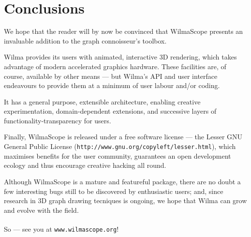 \documentclass[runningheads]{cl2emult}
\newcommand{\url}[1]{{\small{\tt #1}}}
\begin{document}
\section{Conclusions}
\label{sec:conclusions}

We hope that the reader will by now be convinced that WilmaScope presents an
invaluable addition to the graph connoisseur's toolbox.  

Wilma provides its users with animated, interactive 3D rendering, which takes
advantage of modern accelerated graphics hardware.  These facilities are, of
course, available by other means --- but Wilma's API and user interface
endeavours to provide them at a minimum of user labour and/or coding.

It has a general purpose, extensible architecture, enabling creative
experimentation, domain-dependent extensions, and successive layers of
functionality-transparency for users.

Finally, WilmaScope is released under a free software license --- the Lesser
GNU General Public License (\url{http://www.gnu.org/copyleft/lesser.html}),
which maximises benefits for the user community, guarantees an open
development ecology and thus encourage creative hacking all round.

Although WilmaScope is a mature and featureful package, there are no doubt a
few interesting bugs still to be discovered by enthusiastic users; and, since
research in 3D graph drawing tecniques is ongoing, we hope that Wilma can
grow and evolve with the field.  

\paragraph{}

So --- see you at \url{www.wilmascope.org}!

%
%
%
%
%
%
%
\end{document}
